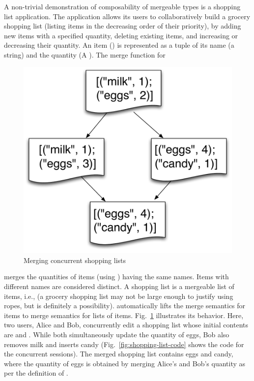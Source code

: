 A non-trivial demonstration of composability of mergeable types is a
shopping list application. The application allows its users to
collaboratively build a grocery shopping list (listing items in the
decreasing order of their priority), by adding new items with a
specified quantity, deleting existing items, and increasing or
decreasing their quantity. An item () is represented as a
tuple of its name (a string) and the quantity (A ). The merge
function for
\begin{figure}
  \centering
  \includegraphics[scale=0.3]{Figures/shopping-list}
  \caption{Merging concurrent shopping lists}
  \label{fig:shopping-list}
\end{figure}
 merges the quantities of items (using ) having
the same names. Items with different names are considered distinct. A
shopping list is a mergeable list of items, i.e.,  (a
grocery shopping list may not be large enough to justify using ropes,
but  is definitely a possibility).
 automatically lifts the merge semantics for
items to merge semantics for lists of items.
Fig.~\ref{fig:shopping-list} illustrates its behavior.  Here, two
users, Alice and Bob, concurrently edit a shopping list whose initial
contents are  and . While both simultaneously update
the quantity of eggs, Bob also removes milk and inserts candy
(Fig.~\ref{fig:shopping-list-code} shows the \name code for the
concurrent sessions). The merged shopping list contains eggs and
candy, where the quantity of eggs is obtained by merging Alice's and
Bob's quantity as per the definition of .

